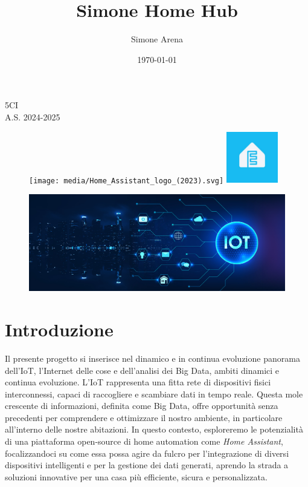 \documentclass[11pt, a4paper]{article}
\title{Simone Home Hub}
\author{Simone Arena}
\date{\today}
\begin{document}
\color{black}

\maketitle

\begin{center}
    5CI\\
    A.S. 2024-2025
\end{center}

\begin{figure}[h!]
    \centering
    \texttt{[image: media/Home\_Assistant\_logo\_(2023).svg]}
    \hspace{1cm} %
    \includegraphics[width=0.2\textwidth]{media/esphome-logo.jpeg}
    \label{fig:logos}
\end{figure}

\newpage

\tableofcontents

\newpage

\begin{figure}[h!]
    \centering
    \includegraphics[width=1\textwidth]{media/iot-banner.jpg}
    \label{fig:iot-banner}
\end{figure}
\section{Introduzione}
Il presente progetto si inserisce nel dinamico 
e in continua evoluzione panorama dell'IoT, l'Internet delle cose
 e dell'analisi dei Big Data, ambiti dinamici e continua evoluzione. 
L'IoT rappresenta una fitta rete di dispositivi 
fisici interconnessi, capaci di raccogliere e 
scambiare dati in tempo reale. Questa mole crescente 
di informazioni, definita come Big Data, offre opportunità 
senza precedenti per comprendere e ottimizzare il nostro ambiente, 
in particolare all'interno delle nostre abitazioni. 
In questo contesto, esploreremo le potenzialità di una 
piattaforma open-source di home automation come \textit{Home Assistant}, 
focalizzandoci su come essa possa agire da fulcro per l'integrazione 
di diversi dispositivi intelligenti e per la gestione dei dati generati, 
aprendo la strada a soluzioni innovative per una casa più efficiente, 
sicura e personalizzata.
\end{document}
